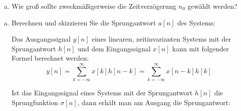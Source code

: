 \begin{uebsp}
\begin{Exercise}
\begin{enumerate}[a)]
    \item Wie groß sollte zweckmäßigerweise die Zeitverzögerung $n_0$ gewählt
    werden?
\end{enumerate}
\end{Exercise}
\begin{Answer}
\begin{enumerate}[a)]
    \item Berechnen und skizzieren Sie die Sprungantwort $a[n]$ des Systems:
    \begin{uebsp_theory}
        Das Ausgangssignal $y[n]$ eines linearen, zeitinvarianten Systems mit der Sprungantwort $h[n]$ und dem Eingangssignal $x[n]$ kann mit folgender Formel berechnet werden:
        \begin{equation}
            y[n]=\sum_{k=-\infty}^\infty x[k]h[n-k]=\sum_{k=-\infty}^\infty
            x[n-k]h[k]
            \label{eq:ausgang_eingang}
        \end{equation}
    \end{uebsp_theory}
    \begin{uebsp_theory}
        Ist das Eingangssignal eines Systems mit der Sprungantwort $h[n]$ die 
        Sprungfunktion $\sigma[n]$, dann erhält man am Ausgang die Sprungantwort:


\end{uebsp_theory}
\end{enumerate}
\end{Answer}
\end{uebsp}
